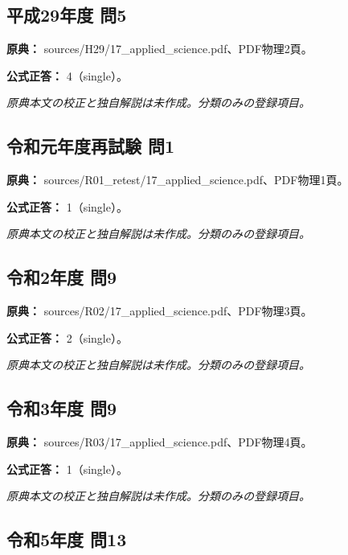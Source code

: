 \subsection{平成29年度 問5}
\label{q:h29-reg-applied-05}

\noindent\textbf{原典：} sources/H29/17\_applied\_science.pdf、PDF物理2頁。

\textbf{公式正答：} 4（single）。

\par\textit{原典本文の校正と独自解説は未作成。分類のみの登録項目。}

\subsection{令和元年度再試験 問1}
\label{q:r01-ret-applied-01}

\noindent\textbf{原典：} sources/R01\_retest/17\_applied\_science.pdf、PDF物理1頁。

\textbf{公式正答：} 1（single）。

\par\textit{原典本文の校正と独自解説は未作成。分類のみの登録項目。}

\subsection{令和2年度 問9}
\label{q:r02-reg-applied-09}

\noindent\textbf{原典：} sources/R02/17\_applied\_science.pdf、PDF物理3頁。

\textbf{公式正答：} 2（single）。

\par\textit{原典本文の校正と独自解説は未作成。分類のみの登録項目。}

\subsection{令和3年度 問9}
\label{q:r03-reg-applied-09}

\noindent\textbf{原典：} sources/R03/17\_applied\_science.pdf、PDF物理4頁。

\textbf{公式正答：} 1（single）。

\par\textit{原典本文の校正と独自解説は未作成。分類のみの登録項目。}

\subsection{令和5年度 問13}
\label{q:r05-reg-applied-13}


